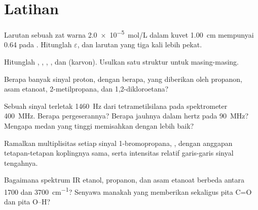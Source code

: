 \section{Latihan}

\begin{exercise}[$\star$]\label{exo:b1:structure-spectroscopy:1}
Larutan sebuah zat warna \qty{2.0e-5}{mol/L} dalam kuvet \qty{1.00}{cm}
mempunyai  0.64 pada . Hitunglah
$\varepsilon$, dan  larutan yang tiga kali lebih pekat.
\end{exercise}

\begin{exercise}[$\star$]\label{exo:b1:structure-spectroscopy:2}
Hitunglah  , , ,
, dan  (karvon). Usulkan satu struktur untuk
masing-masing.
\end{exercise}

\begin{exercise}[$\star$]\label{exo:b1:structure-spectroscopy:3}
Berapa banyak sinyal proton, dengan  berapa, yang diberikan oleh
propanon, asam etanoat, 2-metilpropana, dan 1,2-dikloroetana?
\end{exercise}

\begin{exercise}[$\star$]\label{exo:b1:structure-spectroscopy:4}
Sebuah sinyal terletak \qty{1460}{Hz} dari tetrametilsilana pada
spektrometer \qty{400}{MHz}. Berapa pergeserannya? Berapa jauhnya dalam
hertz pada \qty{90}{MHz}? Mengapa medan yang tinggi memisahkan
 dengan lebih baik?
\end{exercise}

\begin{exercise}[$\star\star$]\label{exo:b1:structure-spectroscopy:5}
Ramalkan multiplisitas setiap sinyal 1-bromopropana,
, dengan anggapan tetapan-tetapan koplingnya sama, serta
intensitas relatif garis-garis sinyal tengahnya.
\end{exercise}

\begin{exercise}[$\star\star$]\label{exo:b1:structure-spectroscopy:6}
Bagaimana spektrum IR etanol, propanon, dan asam etanoat berbeda antara
1700 dan \qty{3700}{cm^{-1}}? Senyawa manakah yang memberikan sekaligus
pita C=O dan pita O--H?
\end{exercise}

